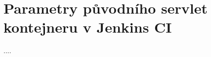 
\chapter{Parametry původního servlet kontejneru v Jenkins CI}
    \label{prilohaParametry}
    ....

